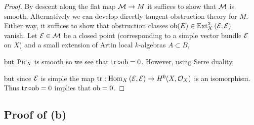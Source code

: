 \documentclass[12pt]{article}
\begin{document}
\begin{proof}
By descent along the flat map $\mathcal{M} \to M$ it suffices to show that $\mathcal{M}$ is smooth. Alternatively we can develop directly tangent-obstruction theory for $M$. Either way, it suffices to show that obstruction classes $\mathrm{ob}(E) \in \mathrm{Ext}^{2}_{X} \left( \mathcal{E}, \mathcal{E} \right)$ vanish. Let $\mathcal{E} \in \mathcal{M}$ be a closed point (corresponding to a simple vector bundle $\mathcal{E}$ on $X$) and a small extension of Artin local $k$-algebras $A \subset B$,
\begin{center}
\end{center}
but $\mathrm{Pic}_X$ is smooth so we see that $\operatorname{\mathrm{tr}} \circ \mathrm{ob} = 0$. However, using Serre duality,
\begin{center}
\end{center}
but since $\mathcal{E}$ is simple the map $\operatorname{\mathrm{tr}} : \mathrm{Hom}_{X} \left( \mathcal{E}, \mathcal{E} \right) \to H^0(X, \mathcal{O}_{X})$ is an isomorphism. Thus $\operatorname{\mathrm{tr}} \circ \mathrm{ob} = 0$ implies that $\mathrm{ob} = 0$.
\end{proof}

\subsection{Proof of (b)}

\newcommand{\cV}{\mathcal{V}}
\end{document}
